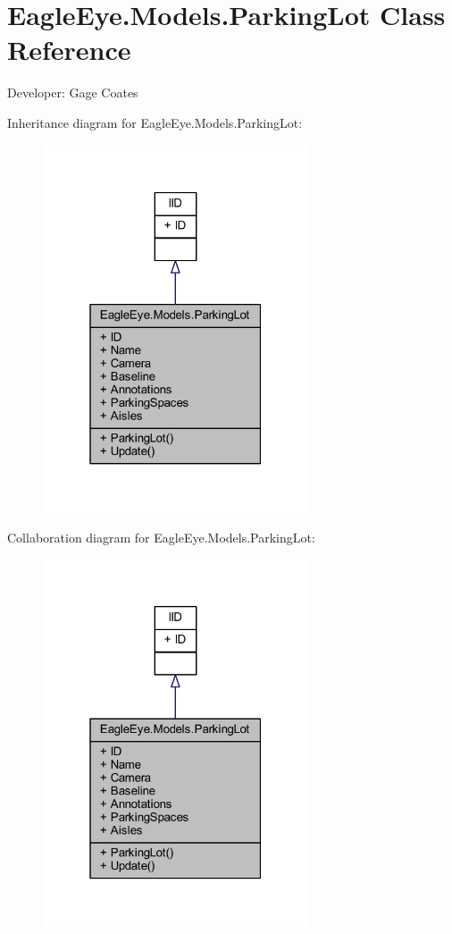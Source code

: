 \hypertarget{class_eagle_eye_1_1_models_1_1_parking_lot}{}\section{Eagle\+Eye.\+Models.\+Parking\+Lot Class Reference}
\label{class_eagle_eye_1_1_models_1_1_parking_lot}


Developer\+: Gage Coates  




Inheritance diagram for Eagle\+Eye.\+Models.\+Parking\+Lot\+:
\nopagebreak
\begin{figure}[H]
\begin{center}
\leavevmode
\includegraphics[width=223pt]{class_eagle_eye_1_1_models_1_1_parking_lot__inherit__graph}
\end{center}
\end{figure}


Collaboration diagram for Eagle\+Eye.\+Models.\+Parking\+Lot\+:
\nopagebreak
\begin{figure}[H]
\begin{center}
\leavevmode
\includegraphics[width=223pt]{class_eagle_eye_1_1_models_1_1_parking_lot__coll__graph}
\end{center}
\end{figure}

